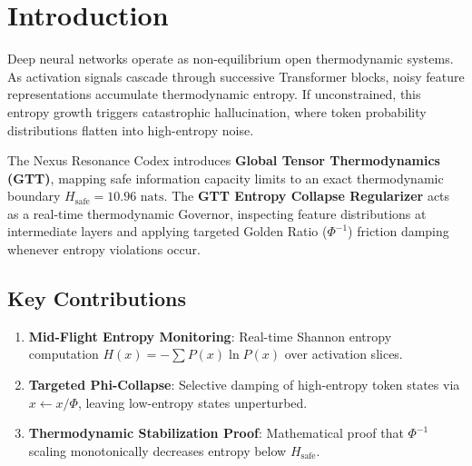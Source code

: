 \section{Introduction}
Deep neural networks operate as non-equilibrium open thermodynamic systems. As activation signals cascade through successive Transformer blocks, noisy feature representations accumulate thermodynamic entropy. If unconstrained, this entropy growth triggers catastrophic hallucination, where token probability distributions flatten into high-entropy noise.

The Nexus Resonance Codex introduces \textbf{Global Tensor Thermodynamics (GTT)}, mapping safe information capacity limits to an exact thermodynamic boundary $H_{\text{safe}} = 10.96\text{ nats}$. The \textbf{GTT Entropy Collapse Regularizer} acts as a real-time thermodynamic Governor, inspecting feature distributions at intermediate layers and applying targeted Golden Ratio ($\Phi^{-1}$) friction damping whenever entropy violations occur.

\subsection{Key Contributions}
\begin{enumerate}[label=\textbf{\arabic*.}]
    \item \textbf{Mid-Flight Entropy Monitoring}: Real-time Shannon entropy computation $H(x) = -\sum P(x) \ln P(x)$ over activation slices.
    \item \textbf{Targeted Phi-Collapse}: Selective damping of high-entropy token states via $x \leftarrow x / \Phi$, leaving low-entropy states unperturbed.
    \item \textbf{Thermodynamic Stabilization Proof}: Mathematical proof that $\Phi^{-1}$ scaling monotonically decreases entropy below $H_{\text{safe}}$.
\end{enumerate}
